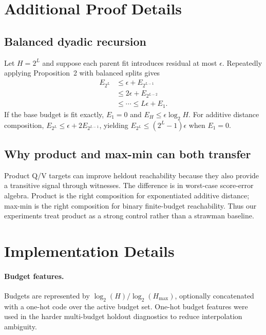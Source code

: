 \documentclass[11pt]{article}
\begin{document}
\appendix

\section{Additional Proof Details}

\subsection{Balanced dyadic recursion}

Let $H=2^L$ and suppose each parent fit introduces residual at most $\epsilon$.
Repeatedly applying Proposition~2 with balanced splits gives
\begin{align}
E_{2^L} &\le \epsilon + E_{2^{L-1}} \\
&\le 2\epsilon + E_{2^{L-2}} \\
&\le \cdots \le L\epsilon + E_1.
\end{align}
If the base budget is fit exactly, $E_1=0$ and $E_H\le \epsilon\log_2 H$. For
additive distance composition,
$E_{2^L}\le \epsilon+2E_{2^{L-1}}$, yielding
$E_{2^L}\le (2^L-1)\epsilon$ when $E_1=0$.

\subsection{Why product and max-min can both transfer}

Product Q/V targets can improve heldout reachability because they also provide a
transitive signal through witnesses. The difference is in worst-case score-error
algebra. Product is the right composition for exponentiated additive distance;
max-min is the right composition for binary finite-budget reachability. Thus our
experiments treat product as a strong control rather than a strawman baseline.

\section{Implementation Details}

\paragraph{Budget features.}
Budgets are represented by $\log_2(H)/\log_2(H_{\max})$, optionally concatenated
with a one-hot code over the active budget set. One-hot budget features were used
in the harder multi-budget holdout diagnostics to reduce interpolation
ambiguity.
\end{document}
